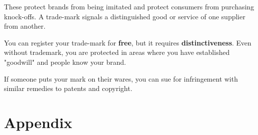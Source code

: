 \documentclass{article}
\renewcommand\appendix{\par
  \setcounter{section}{0}
  \setcounter{subsection}{0}
  \setcounter{figure}{0}
  \setcounter{table}{0}
  \renewcommand\thesection{Appendix \Alph{section}}
  \renewcommand\thefigure{\Alph{section}\arabic{figure}}
  \renewcommand\thetable{\Alph{section}\arabic{table}}
}
\begin{document}
These protect brands from being imitated and protect consumers from purchasing knock-offs. A trade-mark signals a distinguished good or service of one supplier from another. 

You can register your trade-mark for \textbf{free}, but it requires \textbf{distinctiveness}. Even without trademark, you are protected in areas where you have established "goodwill" and people know your brand.

If someone puts your mark  on their wares, you can sue for infringement with similar remedies to patents and copyright.










\newpage

 
\pagebreak


\appendix
\onehalfspacing
\section*{Appendix}
\renewcommand{\thesubsection}{\Alph{subsection}}
\end{document}

